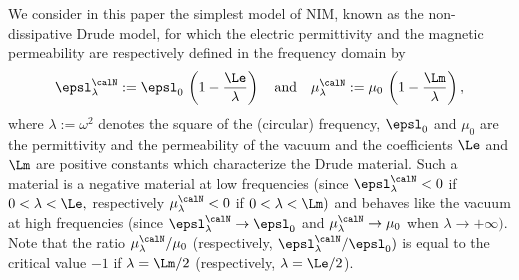 We consider in this paper the simplest model of NIM, known as the non-dissipative Drude model, for which the electric permittivity and the magnetic permeability are respectively defined in the frequency domain by
\begin{equation}\label{e.Drude-model}
\epsl^\calN_\lambda := \epsl_0\, \left(1 - \frac{\Le}{\lambda} \right)
\quad\text{and}\quad
\mu^\calN_\lambda := \mu_0\, \left(1 - \frac{\Lm}{\lambda} \right),
\end{equation}
where $\lambda := \omega^2$ denotes the square of the (circular) frequency, $\epsl_0$ and $\mu_0$ are the permittivity and the permeability of the vacuum and the coefficients $\Le$ and $\Lm$ are positive constants which characterize the Drude material. Such a material is a negative material at low frequencies (since $\epsl^\calN_\lambda < 0$ if $0 < \lambda < \Le,$ respectively $\mu^\calN_\lambda < 0$ if $0 < \lambda < \Lm)$ and behaves like the vacuum at high frequencies (since $\epsl^\calN_\lambda \to \epsl_0$ and $\mu^\calN_\lambda \to \mu_0$ when $\lambda \to +\infty).$ Note that the ratio $\mu^\calN_\lambda/\mu_0$ (respectively, $\epsl^\calN_\lambda/\epsl_0)$ is equal to the critical value $-1$ if $\lambda = \Lm/2$ (respectively, $\lambda = \Le/2$).

